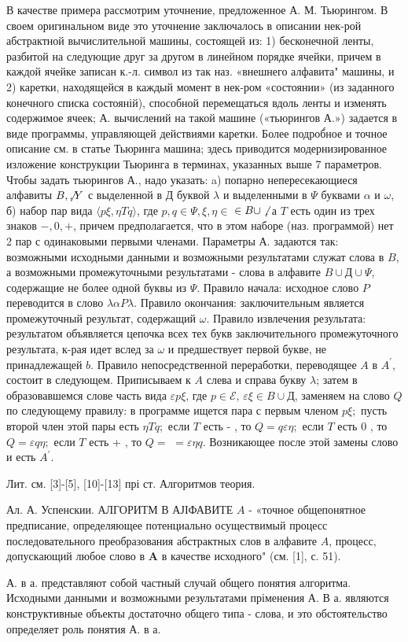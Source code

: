 \documentclass[10pt]{article}
\begin{document}
В качестве примера рассмотрим уточнение, предложенное А. М. Тьюрингом. В своем оригинальном виде это уточнение заключалось в описании нек-рой абстрактной вычислительной машины, состоящей из: 1) бесконечной ленты, разбитой на следующие друг за другом в линейном порядке ячейки, причем в каждой ячейке записан к.-л. символ из так наз. «внешнего алфавита" машины, и 2) каретки, находящейся в каждый момент в нек-ром «состоянии» (из заданного конечного списка состояній), способной перемещаться вдоль ленты и изменять содержимое ячеек; А. вычислений на такой машине («тьюрингов А.») задается в виде программы, управляющей действиями каретки. Более подроб́ное и точное описание см. в статье Тьюринга машина; здесь приводится модернизированное изложение конструкции Тьюринга в терминах, указанных выше 7 параметров. Чтобы задать тьюрингов А., надо указать: a) попарно непересекающиеся алфавиты $B, \not, Y$ с выделенной в $Д$ буквой $\lambda$ и выделенными в $\Psi$ буквами $\alpha$ и $\omega$, б) набор пар вида $\langle p \xi, \eta T q\rangle$, где $p, q \in \Psi, \xi, \eta \in$ $\in B \cup \not$, а $T$ есть один из трех знаков $-, 0,+$, причем предполагается, что в этом наборе (наз. программой) нет 2 пар с одинаковыми первыми членами. Параметры А. задаются так: возможными исходными данными и возможными результатами служат слова в $B$, а возможными промежуточными результатами - слова в алфавите $B \cup Д \cup \Psi$, содержащие не более одной буквы из $\Psi$. Правило начала: исходное слово $P$ переводится в слово $\lambda \alpha P \lambda$. Правило окончания: заключительным является промежуточный результат, содержащий $\omega$. Правило извлечения результата: результатом объявляется цепочка всех тех букв заключительного промежуточного результата, к-рая идет вслед за $\omega$ и предшествует первой букве, не принадлежащей $b$. Правило непосредственной переработки, переводящее $A$ в $A^{\prime}$, состоит в следующем. Приписываем к $A$ слева и справа букву $\lambda$; затем в образовавшемся слове часть вида $\varepsilon p \xi$, где $p \in \mathcal{E}$, $\varepsilon \xi \in B \cup Д$, заменяем на слово $Q$ по следующему правилу: в программе ищется пара с первым членом $p \xi ;$ пусть второй член этой пары есть $\eta T q ;$ если $T$ есть - , то $Q=q \varepsilon \eta ;$ если $T$ есть 0 , то $Q=\varepsilon q \eta ;$ если $T$ есть + , то $Q=$ $=\varepsilon \eta q$. Возникающее после этой замены слово и есть $A^{\prime}$.



Лит. см. [3]-[5], [10]-[13] прі ст. Алгоритмов теория.



Ал. А. Успенскии. АЛГОРИТМ В АЈІФАВИТЕ $A$ - «точное общепонятное предписание, определяющее потенциально осуществимый процесс последовательного преобразования абстрактных слов в алфавите $A$, процесс, допускающий любое слово в $\boldsymbol{A}$ в качестве исходного" (см. [1], с. 51).



А. в а. представляют собой частный случай общего понятия алгоритма. Исходными данными и возможными результатами пріменения А. В а. являются конструктивные объекты достаточно общего типа - слова, и это обстоятельство определяет роль понятия А. в а.
\end{document}

